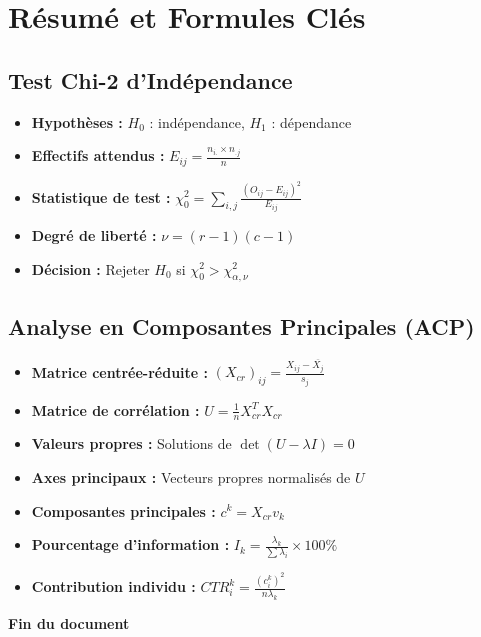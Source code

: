 \documentclass[11pt,a4paper]{article}
\begin{document}
\newpage

\section{Résumé et Formules Clés}

\subsection{Test Chi-2 d'Indépendance}

\begin{itemize}
    \item \textbf{Hypothèses :} $H_0$ : indépendance, $H_1$ : dépendance
    \item \textbf{Effectifs attendus :} $E_{ij} = \frac{n_{i.} \times n_{.j}}{n}$
    \item \textbf{Statistique de test :} $\chi_0^2 = \sum_{i,j} \frac{(O_{ij} - E_{ij})^2}{E_{ij}}$
    \item \textbf{Degré de liberté :} $\nu = (r-1)(c-1)$
    \item \textbf{Décision :} Rejeter $H_0$ si $\chi_0^2 > \chi_{\alpha,\nu}^2$
\end{itemize}

\subsection{Analyse en Composantes Principales (ACP)}

\begin{itemize}
    \item \textbf{Matrice centrée-réduite :} $(X_{cr})_{ij} = \frac{X_{ij} - \overline{X_j}}{s_j}$
    \item \textbf{Matrice de corrélation :} $U = \frac{1}{n} X_{cr}^T X_{cr}$
    \item \textbf{Valeurs propres :} Solutions de $\det(U - \lambda I) = 0$
    \item \textbf{Axes principaux :} Vecteurs propres normalisés de $U$
    \item \textbf{Composantes principales :} $c^k = X_{cr} v_k$
    \item \textbf{Pourcentage d'information :} $I_k = \frac{\lambda_k}{\sum \lambda_i} \times 100\%$
    \item \textbf{Contribution individu :} $CTR_i^k = \frac{(c_i^k)^2}{n \lambda_k}$
\end{itemize}

\vspace{2cm}

\begin{center}
\textbf{Fin du document}
\end{center}
\end{document}
